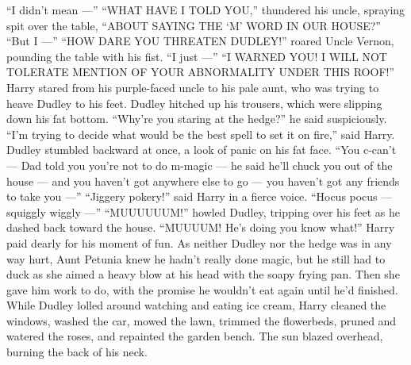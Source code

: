 \documentclass{article}%
\begin{document}
	“I didn’t mean —” “WHAT HAVE I TOLD YOU,” thundered his uncle, spraying spit over the table,\newline%
	“ABOUT SAYING THE ‘M’ WORD IN OUR HOUSE?” “But I —” “HOW DARE YOU THREATEN DUDLEY!” roared Uncle Vernon,\newline%
	pounding the table with his fist. “I just —” “I WARNED YOU! I WILL NOT TOLERATE MENTION OF YOUR ABNORMALITY\newline%
	UNDER THIS ROOF!” Harry stared from his purple{-}faced uncle to his pale \newline%
	aunt, who was trying to heave Dudley to his feet. \newline%
\newline%
	Dudley hitched up his trousers, which were slipping down his fat bottom. “Why’re you staring at the hedge?” \newline%
	he said suspiciously. “I’m trying to decide what would be the best spell to set it on fire,” said Harry.\newline%
	Dudley stumbled backward at once, a look of panic on his fat face. “You c{-}can’t — Dad told you you’re\newline%
	not to do m{-}magic — he said he’ll chuck you out of the house — and you haven’t got anywhere else to \newline%
	go — you haven’t got any friends to take you —” “Jiggery pokery!” said Harry in a fierce voice. \newline%
	“Hocus pocus — squiggly wiggly —” “MUUUUUUM!” howled Dudley, tripping over his feet as he dashed\newline%
	back toward the house. “MUUUUM! He’s doing you know what!” Harry paid dearly for his moment of fun.\newline%
	As neither Dudley nor the hedge was in any way hurt, Aunt Petunia knew he hadn’t really done magic,\newline%
	but he still had to duck as she aimed a heavy blow at his head with the soapy frying pan.\newline%
	Then she gave him work to do, with the promise he wouldn’t eat again until he’d finished.\newline%
	While Dudley lolled around watching and eating ice cream, Harry cleaned the windows,\newline%
	washed the car, mowed the lawn, trimmed the flowerbeds, pruned and watered the roses, \newline%
	and repainted the garden bench. The sun blazed overhead, burning the back of his neck. \newline%
\end{document}
